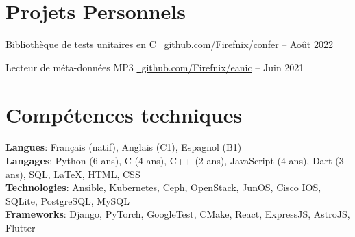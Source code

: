 \resumeSubHeadingListEnd

\section{Projets Personnels} 
    \resumeSubHeadingListStart

        \resumeProjectHeading
        {Bibliothèque de tests unitaires en C}
        {\href{https://github.com/Firefnix/confer}{\raisebox{-0.2\height}\ \underline{github.com/Firefnix/confer}} -- Août 2022}
        \resumeItemListStart
        \resumeItemListEnd
    
        \resumeProjectHeading
        {Lecteur de méta-données MP3}
        {\href{https://github.com/Firefnix/eanic/}{\raisebox{-0.2\height}\ \underline{github.com/Firefnix/eanic}} -- Juin 2021}
        \resumeItemListStart
        \resumeItemListEnd
        
    \resumeSubHeadingListEnd

\section{Compétences techniques}

    \vspace{-7pt}
    \begin{itemize}
    [leftmargin=0.15in, label={}]\small{\item{
        \textbf{Langues}{: Français (natif), Anglais (C1), Espagnol (B1)} \\
        \textbf{Langages}{: Python (6 ans), C (4 ans), C++ (2 ans), JavaScript (4 ans), Dart (3 ans), SQL, \LaTeX, HTML, CSS} \\
        \textbf{Technologies}{: Ansible, Kubernetes, Ceph, OpenStack, JunOS, Cisco IOS, SQLite, PostgreSQL, MySQL} \\
        \textbf{Frameworks}{: Django, PyTorch, GoogleTest, CMake, React, ExpressJS, AstroJS, Flutter} \\}}
    \end{itemize}
